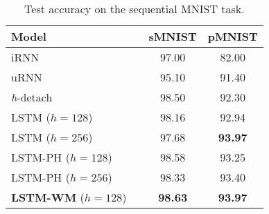 \begin{table}[t!]
\centering
\footnotesize
\caption{Test accuracy on the sequential MNIST task.}
\setlength{\tabcolsep}{.5em}
  \begin{tabular}{lccc}
  \toprule
	 \textbf{Model} & & \textbf{sMNIST} & \textbf{pMNIST} \\
	 \midrule
	 iRNN~\citep{le2015simple} & & 97.00 & 82.00 \\
	 uRNN~\citep{arjovsky2016unitary} & & 95.10 & 91.40 \\
 	 \textit{h}-detach~\citep{arpit2018h} & & 98.50 & 92.30 \\
 	 \midrule
	 LSTM ($h=128$) & & 98.16 & 92.94 \\
	 LSTM ($h=256$) & & 97.68 & \textbf{93.97} \\
	 LSTM-PH ($h=128$) & & 98.58 & 93.25 \\
	 LSTM-PH ($h=256$) & & 98.33 & 93.40 \\
	 \textbf{LSTM-WM} ($h=128$) & & \textbf{98.63} & \textbf{93.97} \\
  \bottomrule
  \end{tabular}
  \label{table:smnist}
\end{table}